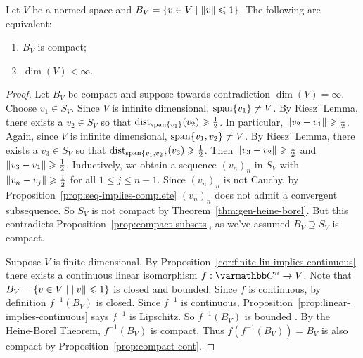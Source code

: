     \begin{theorem}\label{thm:finite-iff-compact}
        Let $V$ be a normed space and $B_V = \{v \in V \mid \left\lVert v \right\rVert \leqslant 1\}$. The following are equivalent:
            \begin{enumerate}[label = (\arabic*),itemsep=1pt,topsep=3pt]
                \item $B_V$ is compact;
                \item $\dim(V) < \infty$.
            \end{enumerate}
    \end{theorem}
        \begin{proof}
            Let $B_V$ be compact and suppose towards contradiction $\dim(V) = \infty$. Choose $v_1 \in S_V$. Since $V$ is infinite dimensional, $\operatorname{span}\{v_1\} \neq V$. By Riesz' Lemma, there exists a $v_2 \in S_V$ so that $\operatorname{dist}_{\operatorname{span}\{v_1\}}(v_2) \geqslant \frac{1}{2}$. In particular, $\left\lVert v_2 - v_1 \right\rVert \geqslant \frac{1}{2}$. Again, since $V$ is infinite dimensional, $\operatorname{span}\{v_1,v_2\} \neq V$. By Riesz' Lemma, there exists a $v_3 \in S_V$ so that $\operatorname{dist}_{\operatorname{span}\{v_1,v_2\}}(v_3) \geqslant \frac{1}{2}$. Then $\left\lVert v_3 - v_2 \right\rVert \geqslant \frac{1}{2}$ and $\left\lVert v_3 - v_1 \right\rVert \geqslant \frac{1}{2}$. Inductively, we obtain a sequence $(v_n)_n$ in $S_V$ with $\left\lVert v_n - v_j \right\rVert \geqslant \frac{1}{2}$ for all $1 \leq j \leq n-1$. Since $(v_n)_n$ is not Cauchy, by Proposition~\ref{prop:seq-implies-complete} $(v_n)_n$ does not admit a convergent subsequence. So $S_V$ is not compact by Theorem~\ref{thm:gen-heine-borel}. But this contradicts Proposition~\ref{prop:compact-subsets}, as we've assumed $B_V \supseteq S_V$ is compact.

            Suppose $V$ is finite dimensional. By Proposition~\ref{cor:finite-lin-implies-continuous} there exists a continuous linear isomorphism $f:\bfC^n \rightarrow V$. Note that $B_V = \{v \in V \mid \left\lVert v \right\rVert \leqslant 1\}$ is closed and bounded. Since $f$ is continuous, by definition $f^{-1}(B_V)$ is closed. Since $f^{-1}$ is continuous, Proposition~\ref{prop:linear-implies-continuous} says $f^{-1}$ is Lipschitz. So $f^{-1}(B_V)$ is bounded . By the Heine-Borel Theorem, $f^{-1}(B_V)$ is compact. Thus $f(f^{-1}(B_V)) = B_V$ is also compact by Proposition~\ref{prop:compact-cont}.
        \end{proof}

